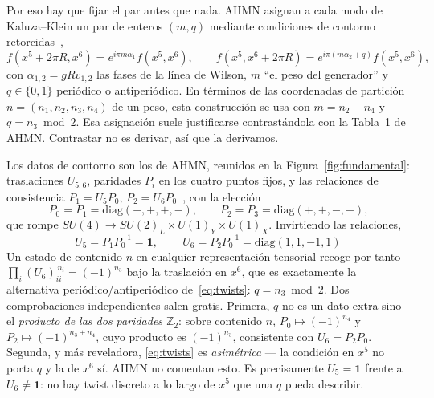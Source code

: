 \documentclass[11pt,a4paper]{article}
\newcommand{\ZZ}{\mathbb{Z}}
\begin{document}
Por eso hay que fijar el par antes que nada. AHMN asignan a cada modo de Kaluza--Klein un par
de enteros $(m,q)$ mediante condiciones de contorno
retorcidas~\cite[Ecs.~(3.3)--(3.4)]{AHMN},
\begin{equation}\label{eq:twists}
f(x^5+2\pi R,x^6)=e^{i\pi m\alpha_1}f(x^5,x^6),\qquad
f(x^5,x^6+2\pi R)=e^{i\pi(m\alpha_2+q)}f(x^5,x^6),
\end{equation}
con $\alpha_{1,2}=gRv_{1,2}$ las fases de la línea de Wilson, $m$ ``el peso del generador'' y
$q\in\{0,1\}$ periódico o antiperiódico. En términos de las coordenadas de partición
$n=(n_1,n_2,n_3,n_4)$ de un peso, esta construcción se usa con $m=n_2-n_4$ y
$q=n_3\bmod2$. Esa asignación suele justificarse contrastándola con la Tabla~1 de AHMN.
Contrastar no es derivar, así que la derivamos.

Los datos de contorno son los de AHMN, reunidos en la Figura~\ref{fig:fundamental}: traslaciones $U_{5,6}$, paridades $P_i$ en los cuatro
puntos fijos, y las relaciones de consistencia $P_1=U_5P_0$, $P_2=U_6P_0$~\cite[Ec.~(2.8)]{AHMN},
con la elección~\cite[Ecs.~(2.9)--(2.10)]{AHMN}
\[
P_0=P_1=\mathrm{diag}(+,+,+,-),\qquad P_2=P_3=\mathrm{diag}(+,+,-,-),
\]
que rompe $SU(4)\to SU(2)_L\times U(1)_Y\times U(1)_X$. Invirtiendo las relaciones,
\begin{equation}\label{eq:U}
U_5=P_1P_0^{-1}=\mathbf{1},\qquad
\boxed{\,U_6=P_2P_0^{-1}=\mathrm{diag}(1,1,-1,1)\,}
\end{equation}
Un estado de contenido $n$ en cualquier representación tensorial recoge por tanto
$\prod_i (U_6)_{ii}^{\,n_i}=(-1)^{n_3}$ bajo la traslación en $x^6$, que es exactamente la
alternativa periódico/antiperiódico de~\eqref{eq:twists}: $q=n_3\bmod2$. Dos comprobaciones
independientes salen gratis. Primera, $q$ no es un dato extra sino el \emph{producto de las
dos paridades $\ZZ_2$}: sobre contenido $n$, $P_0\mapsto(-1)^{n_4}$ y
$P_2\mapsto(-1)^{n_3+n_4}$, cuyo producto es $(-1)^{n_3}$, consistente con $U_6=P_2P_0$.
Segunda, y más reveladora, \eqref{eq:twists} es \emph{asimétrica} --- la condición en $x^5$
no porta $q$ y la de $x^6$ sí. AHMN no comentan esto. Es precisamente $U_5=\mathbf{1}$ frente
a $U_6\neq\mathbf{1}$: no hay twist discreto a lo largo de $x^5$ que una $q$ pueda describir.
\end{document}

